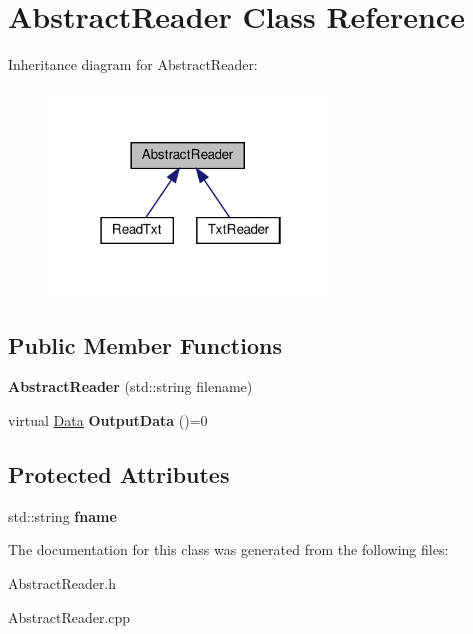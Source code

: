 \hypertarget{classAbstractReader}{}\section{Abstract\+Reader Class Reference}
\label{classAbstractReader}


Inheritance diagram for Abstract\+Reader\+:\nopagebreak
\begin{figure}[H]
\begin{center}
\leavevmode
\includegraphics[width=214pt]{classAbstractReader__inherit__graph}
\end{center}
\end{figure}
\subsection*{Public Member Functions}
\begin{DoxyCompactItemize}
\item 
\mbox{\label{classAbstractReader_af7d4391a1d75538c6bb406c00acabd30}} 
{\bfseries Abstract\+Reader} (std\+::string filename)
\item 
\mbox{\label{classAbstractReader_a14b05f156920be0cfa0cabdb1c6c1267}} 
virtual \hyperlink{structData}{Data} {\bfseries Output\+Data} ()=0
\end{DoxyCompactItemize}
\subsection*{Protected Attributes}
\begin{DoxyCompactItemize}
\item 
\mbox{\label{classAbstractReader_a143f9961ba8aca61c32234a042e466ce}} 
std\+::string {\bfseries fname}
\end{DoxyCompactItemize}


The documentation for this class was generated from the following files\+:\begin{DoxyCompactItemize}
\item 
Abstract\+Reader.\+h\item 
Abstract\+Reader.\+cpp\end{DoxyCompactItemize}
